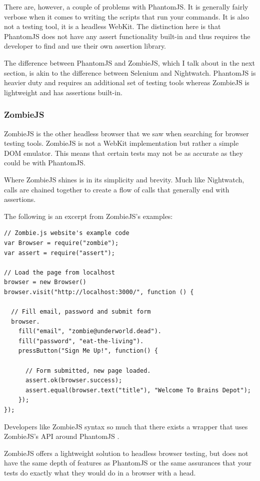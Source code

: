 \documentclass[12pt]{ucthesis}
\begin{document}
There are, however, a couple of problems with PhantomJS. It is generally fairly verbose when it comes to writing the scripts that run your commands. It is also not a testing tool, it is a headless WebKit. The distinction here is that PhantomJS does not have any assert functionality built-in and thus requires the developer to find and use their own assertion library.

The difference between PhantomJS and ZombieJS, which I talk about in the next section, is akin to the difference between Selenium and Nightwatch. PhantomJS is heavier duty and requires an additional set of testing tools whereas ZombieJS is lightweight and has assertions built-in.

\subsubsection{ZombieJS}
ZombieJS \cite{ZombieJS} is the other headless browser that we saw when searching for browser testing tools. ZombieJS is not a WebKit implementation but rather a simple DOM emulator. This means that certain tests may not be as accurate as they could be with PhantomJS.

Where ZombieJS shines is in its simplicity and brevity. Much like Nightwatch, calls are chained together to create a flow of calls that generally end with assertions.

The following is an excerpt from ZombieJS's examples:
\begin{lstlisting}
// Zombie.js website's example code
var Browser = require("zombie");
var assert = require("assert");

// Load the page from localhost
browser = new Browser()
browser.visit("http://localhost:3000/", function () {

  // Fill email, password and submit form
  browser.
    fill("email", "zombie@underworld.dead").
    fill("password", "eat-the-living").
    pressButton("Sign Me Up!", function() {

      // Form submitted, new page loaded.
      assert.ok(browser.success);
      assert.equal(browser.text("title"), "Welcome To Brains Depot");
    });
});
\end{lstlisting}

Developers like ZombieJS syntax so much that there exists a wrapper that uses ZombieJS's API around PhantomJS \cite{ZombiePhantom}.

ZombieJS offers a lightweight solution to headless browser testing, but does not have the same depth of features as PhantomJS or the same assurances that your tests do exactly what they would do in a browser with a head.
\end{document}
